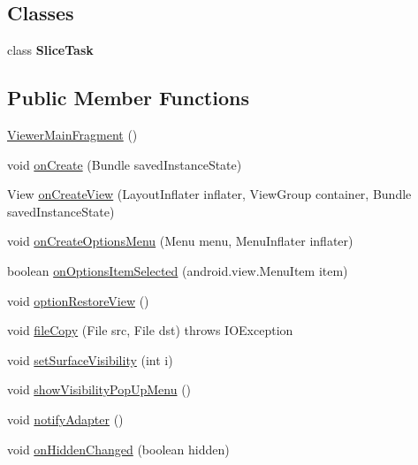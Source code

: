 \subsection*{Classes}
\begin{DoxyCompactItemize}
\item 
class {\bfseries Slice\+Task}
\end{DoxyCompactItemize}
\subsection*{Public Member Functions}
\begin{DoxyCompactItemize}
\item 
\hyperlink{classandroid_1_1app_1_1printerapp_1_1viewer_1_1_viewer_main_fragment_af50de64ea3e9feffd5a479c9537f42dd}{Viewer\+Main\+Fragment} ()
\item 
void \hyperlink{classandroid_1_1app_1_1printerapp_1_1viewer_1_1_viewer_main_fragment_a0ae1a928d4b3f4300fa0c4e4a5ff5012}{on\+Create} (Bundle saved\+Instance\+State)
\item 
View \hyperlink{classandroid_1_1app_1_1printerapp_1_1viewer_1_1_viewer_main_fragment_a0779d1f11e1ff35497cd2ef3d8e6ad0a}{on\+Create\+View} (Layout\+Inflater inflater, View\+Group container, Bundle saved\+Instance\+State)
\item 
void \hyperlink{classandroid_1_1app_1_1printerapp_1_1viewer_1_1_viewer_main_fragment_aaea91f202325269e53161f491fc857f0}{on\+Create\+Options\+Menu} (Menu menu, Menu\+Inflater inflater)
\item 
boolean \hyperlink{classandroid_1_1app_1_1printerapp_1_1viewer_1_1_viewer_main_fragment_a1f9cb8423c7ad003c25be28b24339236}{on\+Options\+Item\+Selected} (android.\+view.\+Menu\+Item item)
\item 
void \hyperlink{classandroid_1_1app_1_1printerapp_1_1viewer_1_1_viewer_main_fragment_a50685753afdb9c86ed284c9b4f1490a3}{option\+Restore\+View} ()
\item 
void \hyperlink{classandroid_1_1app_1_1printerapp_1_1viewer_1_1_viewer_main_fragment_ab94c8b89df095ef2aadcb008822a9f7d}{file\+Copy} (File src, File dst)  throws I\+O\+Exception 
\item 
void \hyperlink{classandroid_1_1app_1_1printerapp_1_1viewer_1_1_viewer_main_fragment_a806d046609d614def11d4fa55302f545}{set\+Surface\+Visibility} (int i)
\item 
void \hyperlink{classandroid_1_1app_1_1printerapp_1_1viewer_1_1_viewer_main_fragment_a719f022921d85d1be3607290cd3b2c9b}{show\+Visibility\+Pop\+Up\+Menu} ()
\item 
void \hyperlink{classandroid_1_1app_1_1printerapp_1_1viewer_1_1_viewer_main_fragment_a81f920d604fc463add397c9340b5cfa5}{notify\+Adapter} ()
\item 
void \hyperlink{classandroid_1_1app_1_1printerapp_1_1viewer_1_1_viewer_main_fragment_ae1c67adf0a7cd3fd8582cde77adbe767}{on\+Hidden\+Changed} (boolean hidden)
\end{DoxyCompactItemize}
